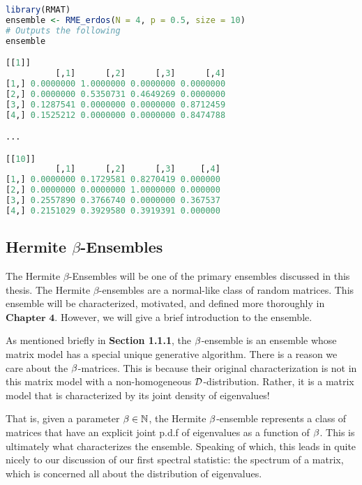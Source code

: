 \begin{lstlisting}[language=R]
library(RMAT)
ensemble <- RME_erdos(N = 4, p = 0.5, size = 10)
# Outputs the following
ensemble

[[1]]
          [,1]      [,2]      [,3]      [,4]
[1,] 0.0000000 1.0000000 0.0000000 0.0000000
[2,] 0.0000000 0.5350731 0.4649269 0.0000000
[3,] 0.1287541 0.0000000 0.0000000 0.8712459
[4,] 0.1525212 0.0000000 0.0000000 0.8474788

...

[[10]]
          [,1]      [,2]      [,3]     [,4]
[1,] 0.0000000 0.1729581 0.8270419 0.000000
[2,] 0.0000000 0.0000000 1.0000000 0.000000
[3,] 0.2557890 0.3766740 0.0000000 0.367537
[4,] 0.2151029 0.3929580 0.3919391 0.000000
\end{lstlisting}

\newpage
\subsection{Hermite $\beta$-Ensembles}

The Hermite $\beta$-Ensembles will be one of the primary ensembles discussed in this thesis. The Hermite $\beta$-ensembles are a normal-like class of random matrices.
This ensemble will be characterized, motivated, and defined more thoroughly in $\textbf{Chapter 4}$. However, we will give a brief introduction to the ensemble.

As mentioned briefly in \textbf{Section 1.1.1}, the $\beta$-ensemble is an ensemble whose matrix model has a special unique generative algorithm. There is a reason we
care about the $\beta$-matrices. This is because their original characterization is not in this matrix model with a non-homogeneous $\mathcal{D}$-distribution. Rather, it is
a matrix model that is characterized by its joint density of eigenvalues!

That is, given a parameter $\beta \in \mathbb{N}$, the Hermite $\beta$-ensemble represents a class of matrices that have an explicit joint p.d.f of eigenvalues as a function of $\beta$.
This is ultimately what characterizes the ensemble. Speaking of which, this leads in quite nicely to our discussion of our first spectral statistic: the spectrum of a matrix, which is concerned all about the distribution of eigenvalues.



\begin{center}
  \Ddisttable
\end{center}
